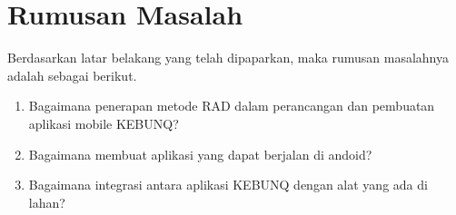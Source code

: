 \begin{flushleft}
\begin{justify}

\end{justify}
\vspace{1cm}   

\section{Rumusan Masalah}
\begin{justify}
  Berdasarkan latar belakang yang telah dipaparkan, maka rumusan masalahnya adalah sebagai berikut.
\end{justify}
\begin{enumerate}
  \item Bagaimana penerapan metode RAD dalam perancangan dan pembuatan aplikasi mobile KEBUNQ?
  \item Bagaimana membuat aplikasi yang dapat berjalan di andoid?
  \item Bagaimana integrasi antara aplikasi KEBUNQ dengan alat yang ada di lahan?
  

\end{enumerate}
\end{flushleft}
